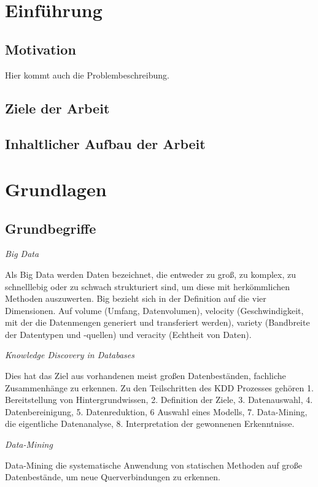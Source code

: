 \chapter{Einführung}
\section{Motivation}
Hier kommt auch die Problembeschreibung.
\section{Ziele der Arbeit}
\section{Inhaltlicher Aufbau der Arbeit}

\chapter{Grundlagen}
\section{Grundbegriffe}
\textit{Big Data}\vspace{0.1cm}

Als Big Data werden Daten bezeichnet, die entweder zu groß, zu komplex, zu schnelllebig oder zu schwach strukturiert sind, um diese mit herkömmlichen Methoden auszuwerten. Big bezieht sich in der Definition auf die vier Dimensionen. Auf volume (Umfang, Datenvolumen), velocity (Geschwindigkeit, mit der die Datenmengen generiert und transferiert werden), variety (Bandbreite der Datentypen und -quellen) und veracity (Echtheit von Daten).\vspace{0.5cm}

\textit{Knowledge Discovery in Databases}\vspace{0.1cm}

Dies hat das Ziel aus vorhandenen meist großen Datenbeständen, fachliche Zusammenhänge zu erkennen. Zu den Teilschritten des KDD Prozesses gehören 1. Bereitstellung von Hintergrundwissen, 2. Definition der Ziele, 3. Datenauswahl, 4. Datenbereinigung, 5. Datenreduktion, 6 Auswahl eines Modells, 7. Data-Mining, die eigentliche Datenanalyse, 8. Interpretation der gewonnenen Erkenntnisse.\vspace{0.5cm}

\textit{Data-Mining}\vspace{0.1cm}

Data-Mining die systematische Anwendung von statischen Methoden auf große Datenbestände, um neue Querverbindungen zu erkennen.

